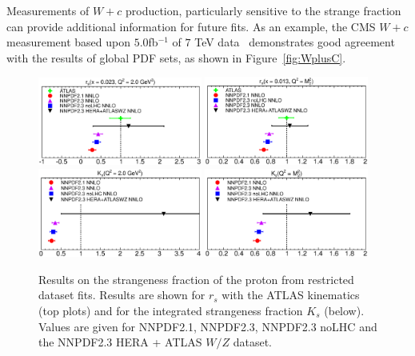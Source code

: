  Measurements of $W+c$ production, particularly sensitive to the strange fraction can provide additional information for future fits. As an example, the CMS $W+c$ measurement based upon $5.0 $fb$^{-1}$ of $7$ TeV data~\cite{Chatrchyan:2013uja} demonstrates good agreement with the results of global PDF sets, as shown in Figure~\ref{fig:WplusC}.

\begin{figure}[ht]
\centering
\includegraphics[width=0.48\textwidth]{6-LHCimpact/figs/rs-2.eps}
\includegraphics[width=0.48\textwidth]{6-LHCimpact/figs/rs-10000.eps}\\
\includegraphics[width=0.48\textwidth]{6-LHCimpact/figs/rs-2-int.eps}
\includegraphics[width=0.48\textwidth]{6-LHCimpact/figs/rs-10000-int.eps}\\
\caption[ Results on the strangeness fraction of the proton from restricted dataset fits ]{Results on the strangeness fraction of the proton from restricted dataset fits. Results are shown for $r_s$ with the ATLAS kinematics (top plots) and for the integrated strangeness fraction $K_s$ (below). Values are given for NNPDF2.1, NNPDF2.3, NNPDF2.3 noLHC and the NNPDF2.3 HERA + ATLAS $W/Z$ dataset.}
\label{fig:NNPDFrs}
\end{figure}


